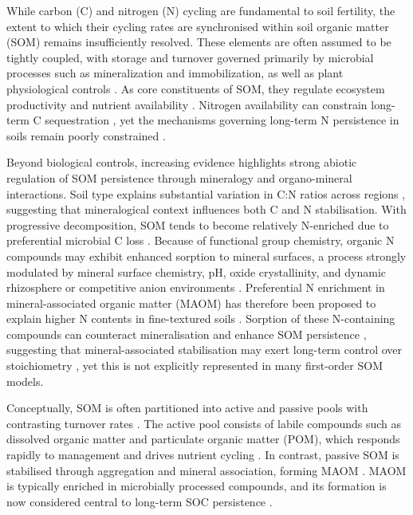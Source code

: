 \documentclass[bg, manuscript]{copernicus}
\begin{document}
\introduction  %
While carbon (C) and nitrogen (N) cycling are fundamental to soil fertility, the extent to which their cycling rates are synchronised within soil organic matter (SOM) remains insufficiently resolved. These elements are often assumed to be tightly coupled, with storage and turnover governed primarily by microbial processes such as mineralization and immobilization, as well as plant physiological controls \citep{Brust2019, Luo2026}. As core constituents of SOM, they regulate ecosystem productivity and nutrient availability \citep{Ma2023}. Nitrogen availability can constrain long-term C sequestration \citep{Luo2006}, yet the mechanisms governing long-term N persistence in soils remain poorly constrained \citep{Luo2026}.

Beyond biological controls, increasing evidence highlights strong abiotic regulation of SOM persistence through mineralogy and organo-mineral interactions. Soil type explains substantial variation in C:N ratios across regions \citep{Ma2023}, suggesting that mineralogical context influences both C and N stabilisation. With progressive decomposition, SOM tends to become relatively N-enriched due to preferential microbial C loss \citep{Xu2013}. Because of functional group chemistry, organic N compounds may exhibit enhanced sorption to mineral surfaces, a process strongly modulated by mineral surface chemistry, pH, oxide crystallinity, and dynamic rhizosphere or competitive anion environments \citep{Kleber2021, Spohn2024, Keiluweit2015}. Preferential N enrichment in mineral-associated organic matter (MAOM) has therefore been proposed to explain higher N contents in fine-textured soils \citep{Spohn2020, Spohn2024}. Sorption of these N-containing compounds can counteract mineralisation and enhance SOM persistence \citep{Hemingway2019, Schmidt2011}, suggesting that mineral-associated stabilisation may exert long-term control over stoichiometry \citep{Koven2013}, yet this is not explicitly represented in many first-order SOM models.

Conceptually, SOM is often partitioned into active and passive pools with contrasting turnover rates \citep{Paustian1992}. The active pool consists of labile compounds such as dissolved organic matter and particulate organic matter (POM), which responds rapidly to management and drives nutrient cycling \citep{Leuthold2023, Brady2017, Samson2020}. In contrast, passive SOM is stabilised through aggregation and mineral association, forming MAOM \citep{Dynarski2020, Trumbore1996}. MAOM is typically enriched in microbially processed compounds, and its formation is now considered central to long-term SOC persistence \citep{Cotrufo2013, Kallenbach2016, Lavallee2020}.
\end{document}
